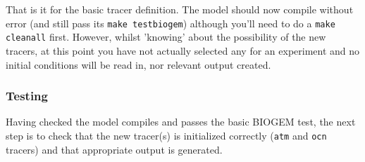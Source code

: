 \documentclass[11pt,fleqn]{book} %
\begin{document}
That is it for the basic tracer definition. The model should now compile without error (and still pass its \texttt{make testbiogem}) although you'll need to do a \texttt{make cleanall} first. However, whilst 'knowing' about the possibility of the new tracers, at this point you have not actually selected any for an experiment and no initial conditions will be read in, nor relevant output created.

%
\subsubsection{Testing}

Having checked the model compiles and passes the basic BIOGEM test, the next step is to check that the new tracer(s) is initialized correctly (\texttt{atm} and \texttt{ocn} tracers) and that appropriate output is generated.
\end{document}
